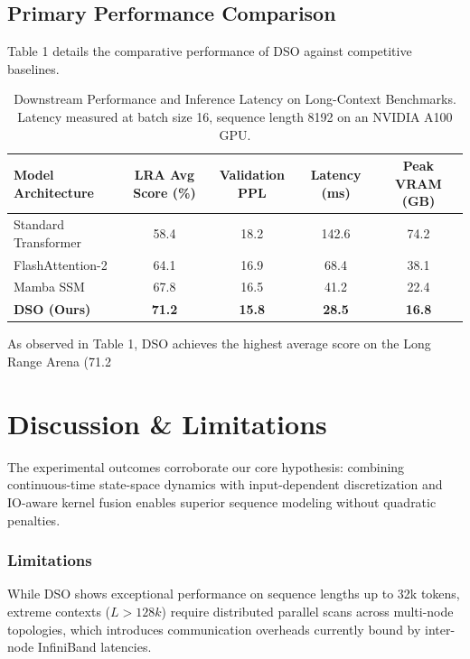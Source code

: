 \documentclass{article}
\begin{document}
\subsection{Primary Performance Comparison}
Table 1 details the comparative performance of DSO against competitive baselines.

\begin{table}[htbp]
\centering
\caption{Downstream Performance and Inference Latency on Long-Context Benchmarks. Latency measured at batch size 16, sequence length 8192 on an NVIDIA A100 GPU.}
\label{tab:main_results}
\begin{tabular}{lcccc}
\toprule
\textbf{Model Architecture} & \textbf{LRA Avg Score (\%)} & \textbf{Validation PPL} & \textbf{Latency (ms)} & \textbf{Peak VRAM (GB)} \\
\midrule
Standard Transformer \cite{vaswani2017attention} & 58.4 & 18.2 & 142.6 & 74.2 \\
FlashAttention-2 \cite{dao2022flashattention} & 64.1 & 16.9 & 68.4 & 38.1 \\
Mamba SSM & 67.8 & 16.5 & 41.2 & 22.4 \\
\textbf{DSO (Ours)} & \textbf{71.2} & \textbf{15.8} & \textbf{28.5} & \textbf{16.8} \\
\bottomrule
\end{tabular}
\end{table}

As observed in Table 1, DSO achieves the highest average score on the Long Range Arena (71.2%


\section{Discussion & Limitations}
The experimental outcomes corroborate our core hypothesis: combining continuous-time state-space dynamics with input-dependent discretization and IO-aware kernel fusion enables superior sequence modeling without quadratic penalties.

\subsubsection{Limitations}
While DSO shows exceptional performance on sequence lengths up to 32k tokens, extreme contexts ($L > 128k$) require distributed parallel scans across multi-node topologies, which introduces communication overheads currently bound by inter-node InfiniBand latencies.
\end{document}
